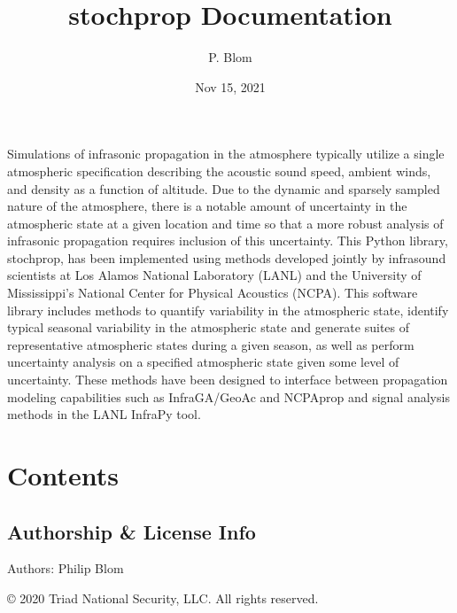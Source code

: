 \documentclass[letterpaper,10pt,english]{sphinxmanual}
\title{stochprop Documentation}
\date{Nov 15, 2021}
\author{P. Blom}
\begin{document}
\pagestyle{empty}
\sphinxmaketitle
\pagestyle{plain}
\sphinxtableofcontents
\pagestyle{normal}
\label{\detokenize{index::doc}}


\sphinxAtStartPar
Simulations of infrasonic propagation in the atmosphere typically utilize a single atmospheric specification describing the acoustic sound speed, ambient winds, and density as a function of altitude.  Due to the dynamic and sparsely sampled nature of the atmosphere, there is a notable amount of uncertainty in the atmospheric state at a given location and time so that a more robust analysis of infrasonic propagation requires inclusion of this uncertainty.  This Python library, stochprop, has been implemented using methods developed jointly by infrasound scientists at Los Alamos National Laboratory (LANL) and the University of Mississippi’s National Center for Physical Acoustics (NCPA).  This software library includes methods to quantify variability in the atmospheric state, identify typical seasonal variability in the atmospheric state and generate suites of representative atmospheric states during a given season, as well as perform uncertainty analysis on a specified atmospheric state given some level of uncertainty.  These methods have been designed to interface between propagation modeling capabilities such as InfraGA/GeoAc and NCPAprop and signal analysis methods in the LANL InfraPy tool.


\chapter{Contents}
\label{\detokenize{index:module-stochprop}}\label{\detokenize{index:contents}}

\section{Authorship \& License Info}
\label{\detokenize{authorship:authorship-license-info}}\label{\detokenize{authorship:authorship}}\label{\detokenize{authorship::doc}}
\sphinxAtStartPar
Authors: Philip Blom

\sphinxAtStartPar
© 2020 Triad National Security, LLC. All rights reserved.
\end{document}
